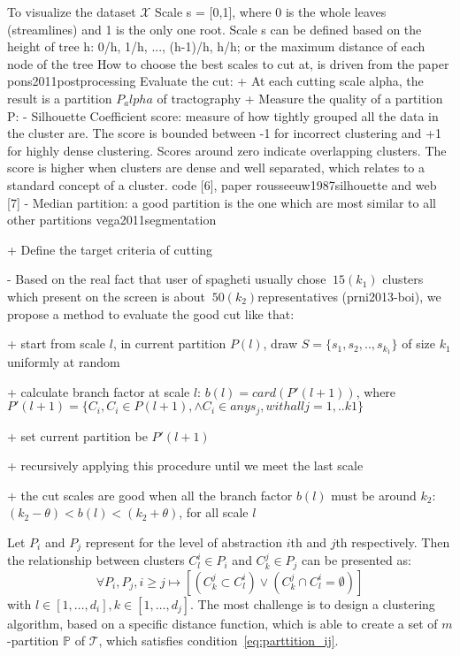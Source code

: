 To visualize the dataset $\mathcal{X}$
Scale s = [0,1], where 0 is the whole leaves (streamlines) and 1 is the only one root. Scale s can be defined based on the height of tree h: 0/h, 1/h, ..., (h-1)/h, h/h; or the maximum distance of each node of the tree \cite{yang2003interactive}
How to choose the best scales to cut at, is driven from the paper pons2011postprocessing
Evaluate the cut:
+ At each cutting scale alpha, the result is a partition $P_alpha$ of tractography
+ Measure the quality of a partition P:
- Silhouette Coefficient score: measure of how tightly grouped all the data in the cluster are. The score is bounded between -1 for incorrect clustering and +1 for highly dense clustering. Scores around zero indicate overlapping clusters. The score is higher when clusters are dense and well separated, which relates to a standard concept of a cluster. code [6], paper rousseeuw1987silhouette and web [7]
- Median partition: a good partition is the one which are most similar to all other partitions vega2011segmentation

+ Define the target criteria of cutting

- Based on the real fact that user of spagheti usually chose $~15 (k_1)$ clusters which present on the screen is about $~50 (k_2)$representatives (prni2013-boi), we propose a method to evaluate the good cut like that:

+ start from scale $l$, in current partition $P(l)$, draw $S=\{s_1,s_2,..,s_{k_1}\}$ of size $k_1$ uniformly at random

+ calculate branch factor at scale $l$: $b(l) = card(P'(l+1))$, where $P'(l+1) = \{C_i, C_i \in P(l+1), \wedge C_i \in any s_j, with all j =1,..k1\}$

+ set current partition be $P'(l+1)$

+ recursively applying this procedure until we meet the last scale

+ the cut scales are good when all the branch factor $b(l)$ must be around $k_2$: $(k_2 - \theta) < b(l)< (k_2 + \theta)$, for all scale $l$

Let $P_i$ and $P_j$ represent for the level of abstraction $i$th and $j$th respectively. Then the relationship between clusters $C_{l}^{i} \in P_i$ and $C_{k}^{j} \in P_j$ can be presented as: 
\begin{equation}
\label{eq:parttition_ij}
	\forall  P_i, P_j, i \geq j \mapsto [(C_{k}^{j} \subset C_{l}^{i}) \vee (C_{k}^{j} \cap  C_{l}^{i} = \emptyset)]    
\end{equation}
with $l \in [1, \ldots, d_i],k \in [1, \ldots, d_j]$. The most challenge is to design a clustering algorithm, based on a specific distance function, which is able to create a set of $m$-partition $\mathbb{P}$ of $\mathcal{T}$, which satisfies condition~\ref{eq:parttition_ij}. 
